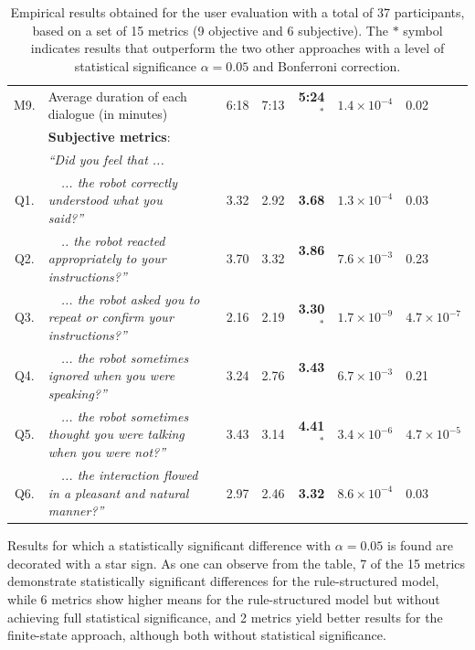 \begin{table}
\begin{tabular}{|cp{110mm}c|r:r:r|p{16mm}|p{16mm}|}
M9.& Average duration of each dialogue  (in minutes) \vspace{3mm} && 6:18 & 7:13 &\textbf{ 5:24}$^{\mathbf{*}}$ & $1.4\!\times\!10^{-4}$ & 0.02 \\ \hdashline
& \vspace{-2mm} \textbf{Subjective metrics}:  && & & & & \\ 
&\textit{``Did you feel that ...}  && & & & & \\ 
Q1.&\ \ \textit{... the robot correctly understood what you said?''}  && 3.32 & 2.92 &  \textbf{3.68} & $1.3\!\times\!10^{-4}$ & 0.03 \\
Q2.& \ \ \textit{.. the robot reacted appropriately to your instructions?''}   && 3.70 & 3.32 & \textbf{3.86}$^{\phantom{*}}$ & $7.6\!\times\!10^{-3}$ & 0.23 \\
Q3.&\ \ \textit{... the robot asked you to repeat or confirm your instructions?''}   & & 2.16 & 2.19 & \textbf{3.30}$^{\mathbf{*}}$ & $1.7\!\times\!10^{-9}$ & $4.7\!\times\!10^{-7}$ \\
Q4.&\ \ \textit{... the robot sometimes ignored when you were speaking?''}  & & 3.24 & 2.76 & \textbf{3.43}$^{\phantom{*}}$ & $6.7\!\times\!10^{-3}$ & 0.21 \\
Q5.&\ \ \textit{... the robot sometimes thought you were talking when you were not?''}  & & 3.43 & 3.14 & \textbf{4.41}$^{\mathbf{*}}$ & $3.4\!\times\!10^{-6}$ & $4.7\!\times\!10^{-5}$ \\
Q6.&\ \ \textit{... the interaction flowed in a pleasant and natural manner?''} \vspace{3mm}  & & 2.97 & 2.46 & \textbf{3.32} & $8.6\!\times\!10^{-4}$ & 0.03 \\ \hline
\end{tabular} \vspace{3mm}
\caption{Empirical results obtained for the user evaluation with a total of 37 participants, based on a set of 15 metrics (9 objective and 6 subjective). The $\mathbf{*}$ symbol indicates results that outperform the two other approaches with a level of statistical significance $\alpha = 0.05$ and Bonferroni correction. }
\label{table:results_exp3}
\end{table}

Results for which a statistically significant difference with $\alpha = 0.05$  is found are decorated with a star sign. As one can observe from the table, 7 of the 15 metrics demonstrate statistically significant differences for the rule-structured model, while 6 metrics show higher means for the rule-structured model but without achieving full statistical significance, and 2 metrics yield better results for the finite-state approach, although both without statistical significance. 

